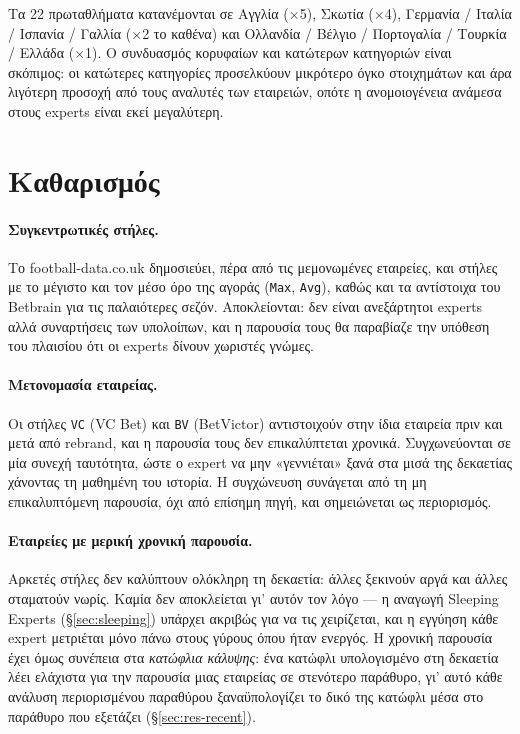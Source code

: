 \documentclass[12pt,a4paper,oneside]{report}
\newcommand{\file}[1]{\texttt{#1}}
\renewcommand{\_}{\oldunderscore\allowbreak}
\theoremstyle{definition}
\theoremstyle{plain}
\theoremstyle{remark}
\begin{document}
Τα 22 πρωταθλήματα κατανέμονται σε Αγγλία ($\times$5), Σκωτία ($\times$4),
Γερμανία / Ιταλία / Ισπανία / Γαλλία ($\times$2 το καθένα) και Ολλανδία / Βέλγιο /
Πορτογαλία / Τουρκία / Ελλάδα ($\times$1). Ο συνδυασμός κορυφαίων και κατώτερων κατηγοριών
είναι σκόπιμος: οι κατώτερες κατηγορίες προσελκύουν μικρότερο όγκο στοιχημάτων και άρα
λιγότερη προσοχή από τους αναλυτές των εταιρειών, οπότε η ανομοιογένεια ανάμεσα στους experts
είναι εκεί μεγαλύτερη.

\section{Καθαρισμός}
\label{sec:data-clean}

\paragraph{Συγκεντρωτικές στήλες.} Το football-data.co.uk δημοσιεύει, πέρα από τις
μεμονωμένες εταιρείες, και στήλες με το μέγιστο και τον μέσο όρο της αγοράς
(\file{Max}, \file{Avg}), καθώς και τα αντίστοιχα του Betbrain για τις παλαιότερες σεζόν.
Αποκλείονται: δεν είναι ανεξάρτητοι experts αλλά συναρτήσεις των υπολοίπων, και η παρουσία
τους θα παραβίαζε την υπόθεση του πλαισίου ότι οι experts δίνουν χωριστές γνώμες.

\paragraph{Μετονομασία εταιρείας.} Οι στήλες \file{VC} (VC Bet) και \file{BV} (BetVictor)
αντιστοιχούν στην ίδια εταιρεία πριν και μετά από rebrand, και η παρουσία τους δεν
επικαλύπτεται χρονικά. Συγχωνεύονται σε μία συνεχή ταυτότητα, ώστε ο expert να μην
«γεννιέται» ξανά στα μισά της δεκαετίας χάνοντας τη μαθημένη του ιστορία. Η συγχώνευση
συνάγεται από τη μη επικαλυπτόμενη παρουσία, όχι από επίσημη πηγή, και σημειώνεται ως
περιορισμός.

\paragraph{Εταιρείες με μερική χρονική παρουσία.} Αρκετές στήλες δεν καλύπτουν ολόκληρη τη
δεκαετία: άλλες ξεκινούν αργά και άλλες σταματούν νωρίς. Καμία δεν αποκλείεται γι' αυτόν τον
λόγο --- η αναγωγή Sleeping Experts (\S\ref{sec:sleeping}) υπάρχει ακριβώς για να τις
χειρίζεται, και η εγγύηση κάθε expert μετριέται μόνο πάνω στους γύρους όπου ήταν ενεργός. Η
χρονική παρουσία έχει όμως συνέπεια στα \emph{κατώφλια κάλυψης}: ένα κατώφλι υπολογισμένο
στη δεκαετία λέει ελάχιστα για την παρουσία μιας εταιρείας σε στενότερο παράθυρο, γι' αυτό
κάθε ανάλυση περιορισμένου παραθύρου ξαναϋπολογίζει το δικό της κατώφλι μέσα στο παράθυρο
που εξετάζει (\S\ref{sec:res-recent}).
\end{document}
